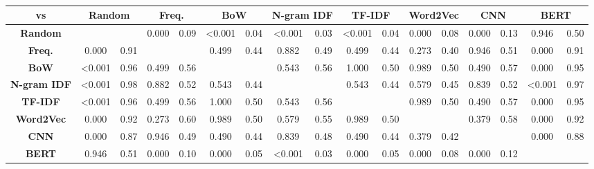 \begin{landscape}
\begin{table}[]
	\centering
	\caption{}
	\label{tab:wilcoxon-moodle}
	\begin{tabular}{@{}ccccccccccccccccc@{}}
		\toprule
		\textbf{vs} &
		\multicolumn{2}{c}{\textbf{Random}} &
		\multicolumn{2}{c}{\textbf{Freq.}} &
		\multicolumn{2}{c}{\textbf{BoW}} &
		\multicolumn{2}{c}{\textbf{N-gram IDF}} &
		\multicolumn{2}{c}{\textbf{TF-IDF}} &
		\multicolumn{2}{c}{\textbf{Word2Vec}} &
		\multicolumn{2}{c}{\textbf{CNN}} &
		\multicolumn{2}{c}{\textbf{BERT}} \\ \midrule
		\textbf{Random} &
		&
		&
		0.000 &
		0.09 &
		\textless{}0.001 &
		0.04 &
		\textless{}0.001 &
		0.03 &
		\textless{}0.001 &
		0.04 &
		0.000 &
		0.08 &
		0.000 &
		0.13 &
		0.946 &
		0.50 \\
		\textbf{Freq.} &
		0.000 &
		0.91 &
		&
		&
		0.499 &
		0.44 &
		0.882 &
		0.49 &
		0.499 &
		0.44 &
		0.273 &
		0.40 &
		0.946 &
		0.51 &
		0.000 &
		0.91 \\
		\textbf{BoW} &
		\textless{}0.001 &
		0.96 &
		0.499 &
		0.56 &
		&
		&
		0.543 &
		0.56 &
		1.000 &
		0.50 &
		0.989 &
		0.50 &
		0.490 &
		0.57 &
		0.000 &
		0.95 \\
		\textbf{N-gram IDF} &
		\textless{}0.001 &
		0.98 &
		0.882 &
		0.52 &
		0.543 &
		0.44 &
		&
		&
		0.543 &
		0.44 &
		0.579 &
		0.45 &
		0.839 &
		0.52 &
		\textless{}0.001 &
		0.97 \\
		\textbf{TF-IDF} &
		\textless{}0.001 &
		0.96 &
		0.499 &
		0.56 &
		1.000 &
		0.50 &
		0.543 &
		0.56 &
		&
		&
		0.989 &
		0.50 &
		0.490 &
		0.57 &
		0.000 &
		0.95 \\
		\textbf{Word2Vec} &
		0.000 &
		0.92 &
		0.273 &
		0.60 &
		0.989 &
		0.50 &
		0.579 &
		0.55 &
		0.989 &
		0.50 &
		&
		&
		0.379 &
		0.58 &
		0.000 &
		0.92 \\
		\textbf{CNN} &
		0.000 &
		0.87 &
		0.946 &
		0.49 &
		0.490 &
		0.44 &
		0.839 &
		0.48 &
		0.490 &
		0.44 &
		0.379 &
		0.42 &
		&
		&
		0.000 &
		0.88 \\
		\textbf{BERT} &
		0.946 &
		0.51 &
		0.000 &
		0.10 &
		0.000 &
		0.05 &
		\textless{}0.001 &
		0.03 &
		0.000 &
		0.05 &
		0.000 &
		0.08 &
		0.000 &
		0.12 &
		&
		\\ \bottomrule
	\end{tabular}	
\end{table}
\end{landscape}

